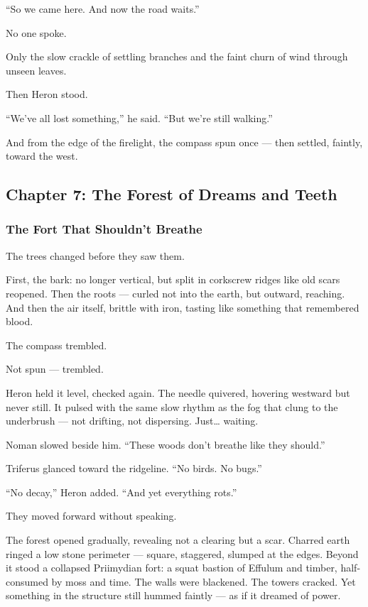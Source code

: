 \documentclass[12pt]{article}
\begin{document}
“So we came here. And now the road waits.”

\vspace{1em}

No one spoke.

Only the slow crackle of settling branches and the faint churn of wind through unseen leaves.

Then Heron stood.

“We’ve all lost something,” he said. “But we’re still walking.”

\vspace{1em}

And from the edge of the firelight, the compass spun once — then settled, faintly, toward the west.

\newpage

\subsection*{Chapter 7: The Forest of Dreams and Teeth}

\vspace{.5in}

\subsubsection*{The Fort That Shouldn’t Breathe}

The trees changed before they saw them.

First, the bark: no longer vertical, but split in corkscrew ridges like old scars reopened. Then the roots — curled not into the earth, but outward, reaching. And then the air itself, brittle with iron, tasting like something that remembered blood.

The compass trembled.

Not spun — trembled.

Heron held it level, checked again. The needle quivered, hovering westward but never still. It pulsed with the same slow rhythm as the fog that clung to the underbrush — not drifting, not dispersing. Just… waiting.

Noman slowed beside him. “These woods don’t breathe like they should.”

Triferus glanced toward the ridgeline. “No birds. No bugs.”

“No decay,” Heron added. “And yet everything rots.”

They moved forward without speaking.

The forest opened gradually, revealing not a clearing but a scar. Charred earth ringed a low stone perimeter — square, staggered, slumped at the edges. Beyond it stood a collapsed Priimydian fort: a squat bastion of Effulum and timber, half-consumed by moss and time. The walls were blackened. The towers cracked. Yet something in the structure still hummed faintly — as if it dreamed of power.
\end{document}
